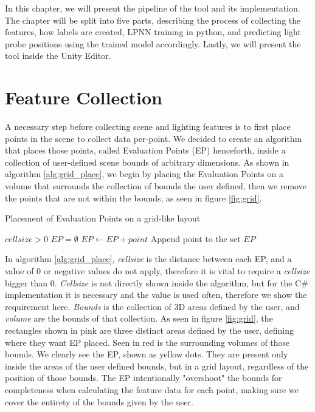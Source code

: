 In this chapter, we will present the pipeline of the tool and its implementation. The chapter will be split into five parts, describing the process of collecting the features, how labels are created, LPNN training in python, and predicting light probe positions using the trained model accordingly. Lastly, we will present the tool inside the Unity Editor.

\section{Feature Collection}
\label{sec:feature_collection}
A necessary step before collecting scene and lighting features is to first place points in the scene to collect data per-point. We decided to create an algorithm that places those points, called Evaluation Points (EP) henceforth, inside a collection of user-defined scene bounds of arbitrary dimensions. As shown in algorithm \ref{alg:grid_place}, we begin by placing the Evaluation Points on a volume that surrounds the collection of bounds the user defined, then we remove the points that are not within the bounds, as seen in figure \ref{fig:grid}.


\begin{algorithm}
	\caption{Placement of Evaluation Points on a grid-like layout}
	\label{alg:grid_place}
	\begin{algorithmic}[1]
		\Require $cellsize > 0$
		\State $EP = \emptyset$
				\State $EP \gets EP + point$ \Comment Append point to the set
			\EndIf
		\EndFor
		\State \Return $EP$
	\end{algorithmic}
\end{algorithm}

In algorithm \ref{alg:grid_place}, \textit{cellsize} is the distance between each EP, and a value of 0 or negative values do not apply, therefore it is vital to require a \textit{cellsize} bigger than 0. \textit{Cellsize} is not directly shown inside the algorithm, but for the C\# implementation it is necessary and the value is used often, therefore we show the requirement here. \textit{Bounds} is the collection of 3D areas defined by the user, and \textit{volume} are the bounds of that collection. As seen in figure \ref{fig:grid}, the rectangles shown in pink are three distinct areas defined by the user, defining where they want EP placed. Seen in red is the surrounding volumes of those bounds. We clearly see the EP, shown as yellow dots. They are present only inside the areas of the user defined bounds, but in a grid layout, regardless of the position of those bounds. The EP intentionally "overshoot" the bounds for completeness when calculating the feature data for each point, making sure we cover the entirety of the bounds given by the user.

